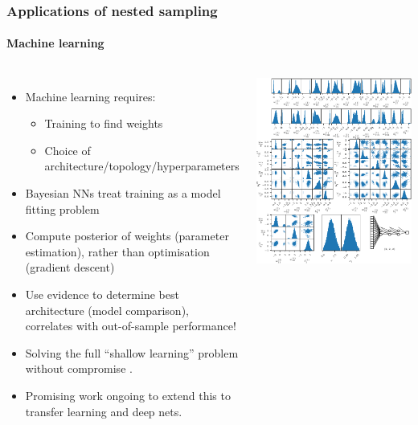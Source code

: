 \documentclass[aspectratio=169]{beamer}
\begin{document}
    \begin{frame}
        \frametitle{Applications of nested sampling}
        \framesubtitle{Machine learning}
        \begin{columns}
            \begin{itemize}
                \item Machine learning requires:
                    \begin{itemize}
                        \item Training to find weights
                        \item Choice of architecture/topology/hyperparameters
                    \end{itemize}
                \item Bayesian NNs treat training as a model fitting problem
                \item Compute posterior of weights (parameter estimation), rather than optimisation (gradient descent)
                \item Use evidence to determine best architecture (model comparison), correlates with out-of-sample performance! 
                \item Solving the full ``shallow learning'' problem without compromise . 
                \item Promising work ongoing to extend this to transfer learning and deep nets.
            \end{itemize}
            \includegraphics[width=\textwidth]{figures/nn_posterior-cropped.pdf}
        \end{columns}
    \end{frame}
\end{document}
